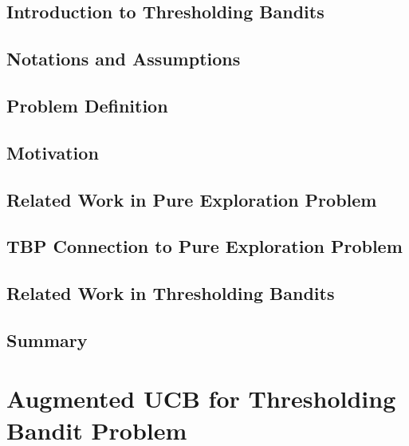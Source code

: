 \documentclass[MS,twoside]{iitmdiss}
\newcommand{\clearemptydoublepage}{\newpage{\cleardoublepage}}
\begin{document}
\section{Introduction to Thresholding Bandits}
\label{tbandit:intro1}


\section{Notations and Assumptions}
\label{tbandit:notations}


\section{Problem Definition}
\label{tbandit:probDef}


\section{Motivation}
\label{tbandit:motivation}


\section{Related Work in Pure Exploration Problem}
\label{tbandit:prevRes}


\section{TBP Connection to Pure Exploration Problem}
\label{tbandit:connection}



\section{Related Work in Thresholding Bandits}
\label{tbandit:prevResAPT}



\section{Summary}
\label{tbandit:conc}







\clearemptydoublepage
\chapter{Augmented UCB for Thresholding Bandit Problem}
\label{chap:tbandit2}
\end{document}
